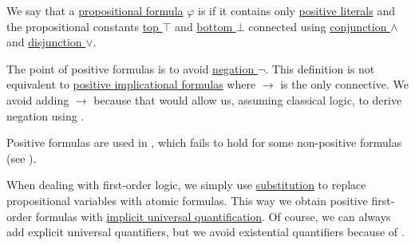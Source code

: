 \begin{definition}\label{def:positive_formula}
  We say that a \hyperref[def:propositional_syntax/formula]{propositional formula} \( \varphi \) is  if it contains only \hyperref[def:conjunctive_disjunctive_normal_form/literal]{positive literals} and the propositional constants \hyperref[def:propositional_language/constants/verum]{top \( \top \)} and \hyperref[def:propositional_language/constants/falsum]{bottom \( \bot \)} connected using \hyperref[def:propositional_language/connectives/conjunction]{conjunction \( \wedge \)} and \hyperref[def:propositional_language/connectives/disjunction]{disjunction \( \vee \)}.

  The point of positive formulas is to avoid \hyperref[def:propositional_language/negation]{negation \( \neg \)}. This definition is not equivalent to \hyperref[def:positive_implicational_propositional_derivation_system]{positive implicational formulas} where \( \rightarrow \) is the only connective. We avoid adding \( \rightarrow \) because that would allow us, assuming classical logic, to derive negation using .

  Positive formulas are used in , which fails to hold for some non-positive formulas (see ).

  When dealing with first-order logic, we simply use \hyperref[thm:first_order_substitution_equivalence/propositional]{substitution} to replace propositional variables with atomic formulas. This way we obtain positive first-order formulas with \hyperref[thm:implicit_universal_quantification]{implicit universal quantification}. Of course, we can always add explicit universal quantifiers, but we avoid existential quantifiers because of .
\end{definition}

